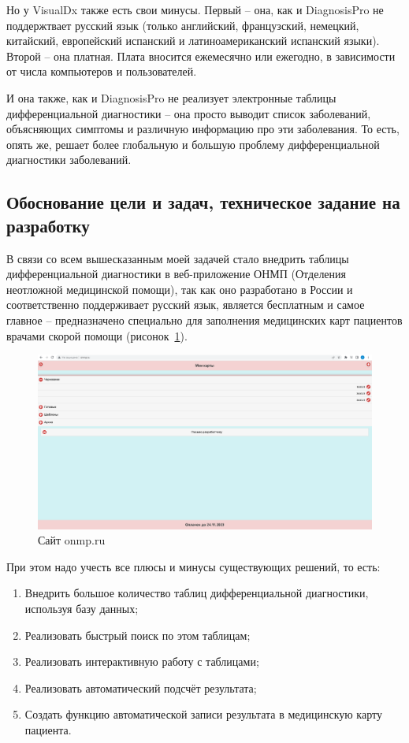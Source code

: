 Но у VisualDx также есть свои минусы. Первый -- она, как и  DiagnosisPro не поддержтвает русский язык (только английский, французский, немецкий, китайский, европейский испанский и латиноамериканский испанский языки). Второй -- она платная. Плата вносится ежемесячно или ежегодно, в зависимости от числа компьютеров и пользователей.

И она также, как и DiagnosisPro не реализует электронные таблицы дифференциальной диагностики -- она просто выводит список заболеваний, объясняющих симптомы и различную информацию про эти заболевания. То есть, опять же, решает более глобальную и большую проблему дифференциальной диагностики заболеваний.

\subsection{Обоснование цели и задач, техническое задание на разработку}

В связи со всем вышесказанным моей задачей стало внедрить таблицы дифференциальной диагностики в веб-приложение ОНМП (Отделения неотложной медицинской помощи), так как оно разработано в России и соответственно поддерживает русский язык, является бесплатным и самое главное -- предназначено специально для заполнения медицинских карт пациентов врачами скорой помощи (рисонок~\ref{fig:onmp0}). 

\begin{figure}
  \includegraphics[scale=0.3]{src/onmp0.png}
  \caption{Сайт onmp.ru}
  \label{fig:onmp0}
\end{figure}

При этом надо учесть все плюсы и минусы существующих решений, то есть:

\begin{enumerate}
  \item Внедрить большое количество таблиц дифференциальной диагностики, используя базу данных;
  \item Реализовать быстрый поиск по этом таблицам;
  \item Реализовать интерактивную работу с таблицами;
  \item Реализовать автоматический подсчёт результата;
  \item Создать функцию автоматической записи результата в медицинскую карту пациента.
\end{enumerate}


